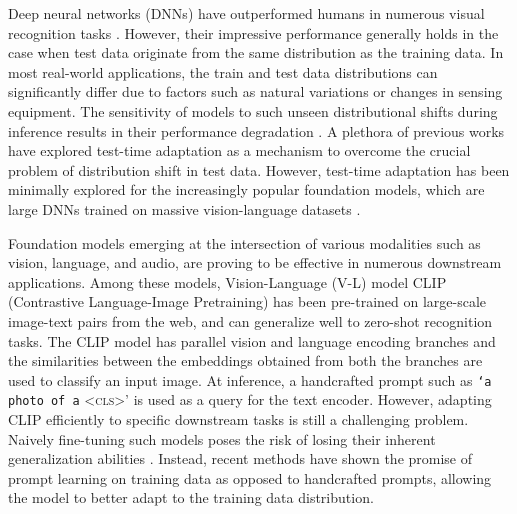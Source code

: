 \documentclass[a4paper]{article}
\begin{document}
Deep neural networks (DNNs) have outperformed humans in numerous visual recognition tasks \cite{he2015delving, esteva2017dermatologist}. 
However, their impressive performance generally holds in the case when test data originate from the same distribution as the training data. 
In most real-world applications, the train and test data distributions can significantly differ 
due to factors such as natural variations or changes in sensing equipment. The sensitivity of models to such unseen distributional shifts during inference results in their performance degradation \cite{hendrycks2019benchmarking, recht2019imagenet, quinonero2008dataset}. A plethora of previous works \cite{sun2020test, wang2022continual, wang2020tent} have explored test-time adaptation as a mechanism to overcome the crucial problem of distribution shift in test data. 
However, test-time adaptation has been minimally explored for the increasingly popular foundation models, which are large DNNs trained on massive vision-language datasets \cite{radford2021learning, jia2021scaling, zhai2022lit, yao2021filip, yuan2021florence}. 
\par

Foundation models emerging at the intersection of various modalities such as vision, language, and audio, are proving to be effective in numerous downstream applications. Among these models, Vision-Language (V-L) model CLIP (Contrastive Language-Image Pretraining) \cite{radford2021learning} has been pre-trained on large-scale image-text pairs from the web, and can generalize well to  zero-shot recognition tasks. The CLIP model has parallel vision and language encoding branches and the similarities between the embeddings obtained from both the branches are used to classify an input image. At inference, a handcrafted prompt such as \texttt{`a photo of a} <{\textsc{cls}}>' is used as a query for the text encoder. However, adapting CLIP efficiently to specific downstream tasks is still a challenging problem. Naively fine-tuning such models poses the risk of losing their inherent generalization abilities \cite{kumar2022fine}. Instead, recent methods have shown the promise of prompt learning on training data \cite{zhou2022coop, zhou2022cocoop, khattakMaPLe, khattak2023self, zang2022unified} as opposed to handcrafted prompts, allowing the model to better adapt to the training data distribution.\par
\end{document}
